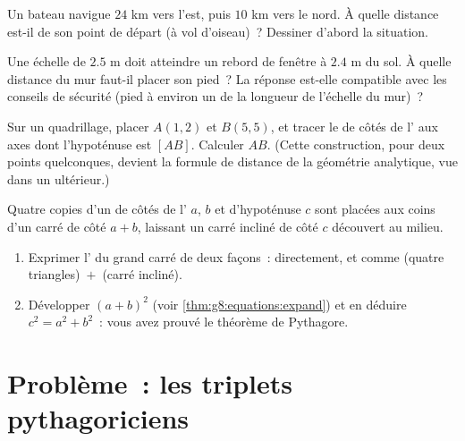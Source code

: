 \begin{exercise}[$\star\star$]\label{exo:g8:pythagoras:8}
Un bateau navigue $24$ km vers l'est, puis $10$ km vers le nord. À
quelle distance est-il de son point de départ (à vol d'oiseau)~?
Dessiner d'abord la situation.
\end{exercise}

\begin{exercise}[$\star\star$]\label{exo:g8:pythagoras:9}
Une échelle de $2.5$ m doit atteindre un rebord de fenêtre à $2.4$ m
du sol. À quelle distance du mur faut-il placer son pied~? La réponse
est-elle compatible avec les conseils de sécurité (pied à environ un
 de la longueur de l'échelle du mur)~?
\end{exercise}

\begin{exercise}[$\star\star$]\label{exo:g8:pythagoras:10}
Sur un quadrillage, placer $A(1, 2)$ et $B(5, 5)$, et tracer le
 de côtés de l'  aux axes dont
l'hypoténuse est $[AB]$. Calculer $AB$. (Cette construction, pour
deux points quelconques, devient la formule de distance de la
géométrie analytique, vue dans un  ultérieur.)
\end{exercise}

\begin{exercise}[$\star\star\star$]\label{exo:g8:pythagoras:11}
Quatre copies d'un  de côtés de l' $a$,
$b$ et d'hypoténuse $c$ sont placées aux coins d'un carré de côté
$a + b$, laissant un carré incliné de côté $c$ découvert au milieu.
\begin{enumerate}
  \item Exprimer l' du grand carré de deux façons~: directement,
        et comme (quatre triangles)~$+$~(carré incliné).
  \item Développer $(a + b)^2$ (voir \cref{thm:g8:equations:expand})
        et en déduire $c^2 = a^2 + b^2$~: vous avez prouvé le
        théorème de Pythagore.
\end{enumerate}
\end{exercise}

\section{Problème~: les triplets pythagoriciens}

